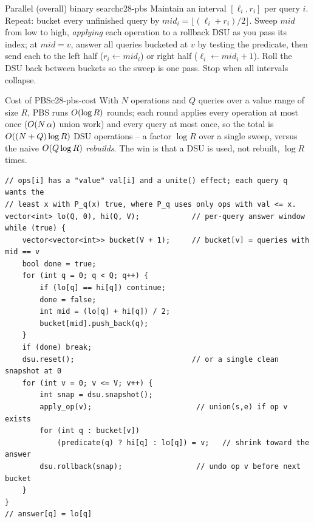 \begin{definition}{Parallel (overall) binary search}{c28-pbs}
Maintain an interval \([\ell_i,r_i]\) per query \(i\).  Repeat: bucket every
unfinished query by \(\mathit{mid}_i=\lfloor(\ell_i+r_i)/2\rfloor\).  Sweep
\(\mathit{mid}\) from low to high, \emph{applying} each operation to a rollback
DSU as you pass its index; at \(\mathit{mid}=v\), answer all queries bucketed
at \(v\) by testing the predicate, then send each to the left half
(\(r_i\leftarrow\mathit{mid}_i\)) or right half (\(\ell_i\leftarrow\mathit{mid}_i+1\)).
Roll the DSU back between buckets so the sweep is one pass.  Stop when all
intervals collapse.
\end{definition}

\begin{proposition}{Cost of PBS}{c28-pbs-cost}
With \(N\) operations and \(Q\) queries over a value range of size \(R\), PBS
runs \(O(\log R)\) rounds; each round applies every operation at most once
(\(O(N\,\alpha)\) union work) and every query at most once, so the total is
\(O((N+Q)\log R)\) DSU operations -- a factor \(\log R\) over a single
sweep, versus the naive \(O(Q\log R)\) \emph{rebuilds}.  The win is that a
DSU is used, not rebuilt, \(\log R\) times.
\end{proposition}

\begin{lstlisting}[caption={overall binary search skeleton: one rollback DSU drives every probe}, label={lst:c28-pbs}]
// ops[i] has a "value" val[i] and a unite() effect; each query q wants the
// least x with P_q(x) true, where P_q uses only ops with val <= x.
vector<int> lo(Q, 0), hi(Q, V);            // per-query answer window
while (true) {
    vector<vector<int>> bucket(V + 1);     // bucket[v] = queries with mid == v
    bool done = true;
    for (int q = 0; q < Q; q++) {
        if (lo[q] == hi[q]) continue;
        done = false;
        int mid = (lo[q] + hi[q]) / 2;
        bucket[mid].push_back(q);
    }
    if (done) break;
    dsu.reset();                           // or a single clean snapshot at 0
    for (int v = 0; v <= V; v++) {
        int snap = dsu.snapshot();
        apply_op(v);                        // union(s,e) if op v exists
        for (int q : bucket[v])
            (predicate(q) ? hi[q] : lo[q]) = v;   // shrink toward the answer
        dsu.rollback(snap);                 // undo op v before next bucket
    }
}
// answer[q] = lo[q]
\end{lstlisting}

